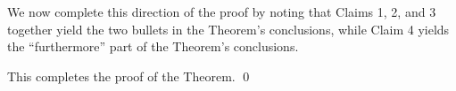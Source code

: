 \vskip 0.5cm
\noindent
We now complete this direction of the proof by noting that Claims 1, 2, and 3
together yield the two bullets in the Theorem's conclusions, while Claim 4 yields
the ``furthermore'' part of the Theorem's conclusions.

\vskip 0.5cm
\noindent
This completes the proof of the Theorem.
\qed

